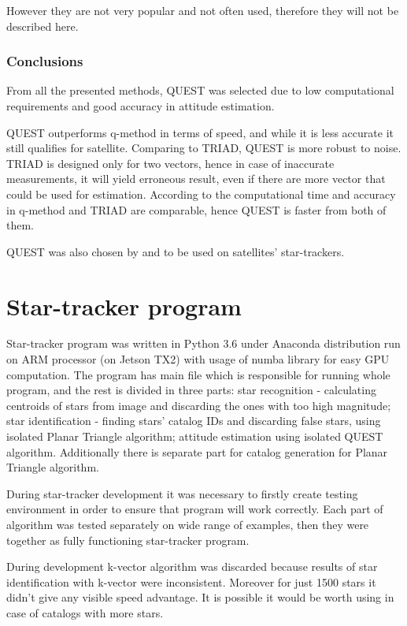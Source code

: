 \documentclass[12pt,a4paper,twoside]{article}
\begin{document}
However they are not very popular and not often used, therefore they will not be described here.

\subsubsection{Conclusions}


From all the presented methods, QUEST was selected due to low computational requirements and good accuracy in attitude estimation.

QUEST outperforms q-method in terms of speed\cite{markley1999estimate}, and while it is less accurate it still qualifies for satellite. Comparing to TRIAD, QUEST is more robust to noise. TRIAD is designed only for two vectors, hence in case of inaccurate measurements, it will yield erroneous result, even if there are more vector that could be used for estimation. According to \citet{ccelik2013comparison} the computational time and accuracy in q-method and TRIAD are comparable, hence QUEST is faster from both of them.

QUEST was also chosen by \citet{huffman2006designing} and \citet{tappe2009development} to be used on satellites' star-trackers.

\newpage
\section{Star-tracker program}

Star-tracker program was written in Python 3.6 under Anaconda distribution run on ARM processor (on Jetson TX2) with usage of numba library for easy GPU computation. The program has main file which is responsible for running whole program, and the rest is divided in three parts: star recognition - calculating centroids of stars from image and discarding the ones with too high magnitude; star identification - finding stars' catalog IDs and discarding false stars, using isolated Planar Triangle algorithm; attitude estimation using isolated QUEST algorithm. Additionally there is separate part for catalog generation for Planar Triangle algorithm.

During star-tracker development it was necessary to firstly create testing environment in order to ensure that program will work correctly. Each part of algorithm was tested separately on wide range of examples, then they were together as fully functioning star-tracker program.

During development k-vector algorithm was discarded because results of star identification with k-vector were inconsistent. Moreover for just 1500 stars it didn't give any visible speed advantage. It is possible it would be worth using in case of catalogs with more stars.
\end{document}
